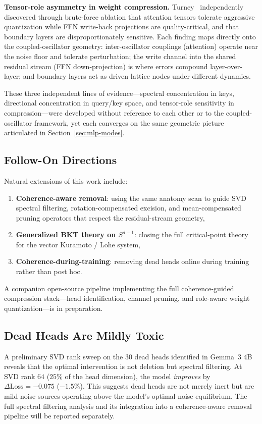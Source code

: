 \documentclass[aps,prd,onecolumn,superscriptaddress,showpacs,12pt]{revtex4-2}
\begin{document}
\textbf{Tensor-role asymmetry in weight compression.}
Turney~\cite{Turney2026} independently discovered through brute-force ablation
that attention tensors tolerate aggressive quantization while FFN write-back
projections are quality-critical, and that boundary layers are
disproportionately sensitive. Each finding maps directly onto the
coupled-oscillator geometry: inter-oscillator couplings (attention) operate
near the noise floor and tolerate perturbation; the write channel into the
shared residual stream (FFN down-projection) is where errors compound
layer-over-layer; and boundary layers act as driven lattice nodes under
different dynamics.

These three independent lines of evidence---spectral concentration in keys,
directional concentration in query/key space, and tensor-role sensitivity in
compression---were developed without reference to each other or to the
coupled-oscillator framework, yet each converges on the same geometric picture
articulated in
Section~\ref{sec:mlp-modes}.

\subsection{Follow-On Directions}

Natural extensions of this work include:
\begin{enumerate}
\item \textbf{Coherence-aware removal}: using the same anatomy scan to guide
SVD spectral filtering, rotation-compensated excision, and mean-compensated
pruning operators that respect the residual-stream geometry,
\item \textbf{Generalized BKT theory on $S^{d-1}$}: closing the full
critical-point theory for the vector Kuramoto / Lohe system,
\item \textbf{Coherence-during-training}: removing dead heads online during
training rather than post hoc.
\end{enumerate}
A companion open-source pipeline implementing the full coherence-guided
compression stack---head identification, channel pruning, and role-aware weight
quantization---is in preparation.

\subsection{Dead Heads Are Mildly Toxic}

A preliminary SVD rank sweep on the 30 dead heads identified in Gemma~3 4B
reveals that the optimal intervention is not deletion but spectral filtering.
At SVD rank $64$ ($25\%$ of the head dimension), the model \emph{improves}
by $\Delta\text{Loss}=-0.075$ ($-1.5\%$). This suggests dead heads are not
merely inert but are mild noise sources operating above the model's optimal
noise equilibrium. The full spectral filtering analysis and its integration
into a coherence-aware removal pipeline will be reported separately.
\end{document}
